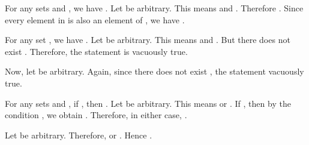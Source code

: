 \startexercises [title={\getvariable{document}{author}  \hfill  \getvariable{document}{course}  \hfill  2019-09-10}]
	
	\startproposition [title={Exercise 1.8}]
		For any sets  and , we have .
	\stopproposition
	\startproof
		Let  be arbitrary. This means  and . Therefore . Since every element in  is also an element of , we have .
	\stopproof

	\startproposition [title={Exercise 1.10}]
		For any set , we have .
	\stopproposition
	\startproof
		Let  be arbitrary. This means  and . But there does not exist . Therefore, the statement is vacuously true.

		Now, let  be arbitrary. Again, since there does not exist , the statement vacuously true.
	\stopproof

	\startproposition [title={Exercise 1.13}]
		For any sets  and , if , then .
	\stopproposition
	\startproof
		Let  be arbitrary. This means  or . If , then by the condition , we obtain . Therefore, in either case, .

		Let  be arbitrary. Therefore,  or . Hence .
	\stopproof

\stopexercises